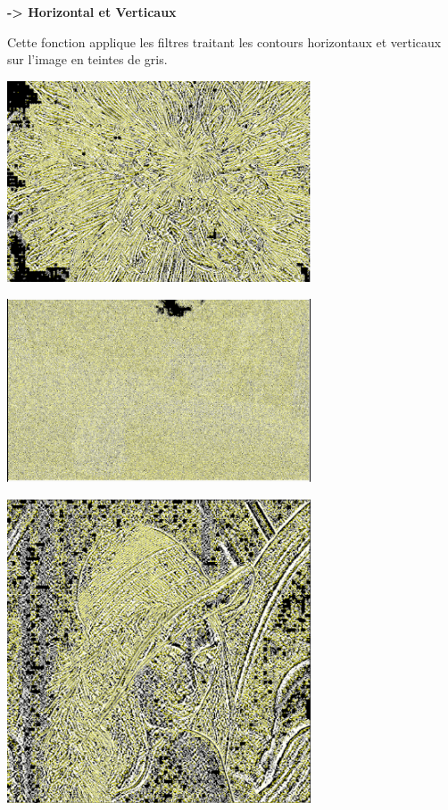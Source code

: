 \documentclass{article}
\begin{document}
\textbf{-> Horizontal et Verticaux}

Cette fonction applique les filtres traitant les contours horizontaux et verticaux sur l'image en teintes de gris.

\begin{center} 
    \includegraphics[width=9cm]{../Image_fonctions/Multicolor/Sobel.PNG}
\end{center}
\begin{center} 
    \includegraphics[width=9cm]{../Image_fonctions/Cat/Sobel.PNG}
\end{center}
\begin{center} 
    \includegraphics[width=9cm]{../Image_fonctions/Lenna/Sobel.PNG}
\end{center}
\end{document}
